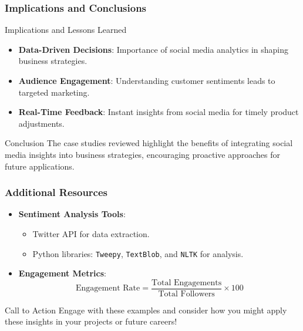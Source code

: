 \documentclass{beamer}
\begin{document}
\begin{frame}[fragile]
    \frametitle{Implications and Conclusions}
    \begin{block}{Implications and Lessons Learned}
        \begin{itemize}
            \item \textbf{Data-Driven Decisions}: Importance of social media analytics in shaping business strategies.
            \item \textbf{Audience Engagement}: Understanding customer sentiments leads to targeted marketing.
            \item \textbf{Real-Time Feedback}: Instant insights from social media for timely product adjustments.
        \end{itemize}
    \end{block}

    \begin{block}{Conclusion}
        The case studies reviewed highlight the benefits of integrating social media insights into business strategies, encouraging proactive approaches for future applications.
    \end{block}
\end{frame}

\begin{frame}[fragile]
    \frametitle{Additional Resources}
    \begin{itemize}
        \item \textbf{Sentiment Analysis Tools}:
            \begin{itemize}
                \item Twitter API for data extraction.
                \item Python libraries: \texttt{Tweepy}, \texttt{TextBlob}, and \texttt{NLTK} for analysis.
            \end{itemize}
        \item \textbf{Engagement Metrics}:
            \begin{equation}
                \text{Engagement Rate} = \frac{\text{Total Engagements}}{\text{Total Followers}} \times 100
            \end{equation}
    \end{itemize}
    
    \begin{block}{Call to Action}
        Engage with these examples and consider how you might apply these insights in your projects or future careers!
    \end{block}
\end{frame}
\end{document}
